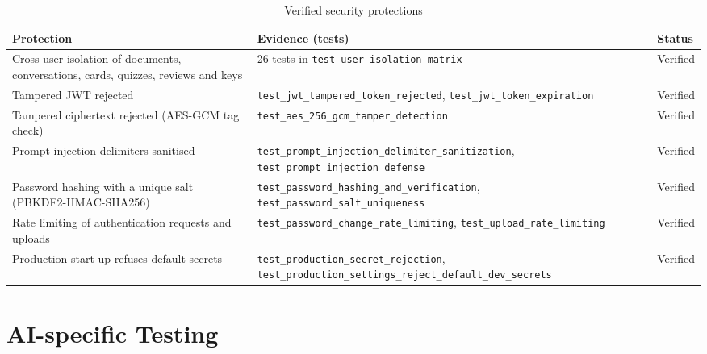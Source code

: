 \begin{table}[!htbp]
\centering
\caption{Verified security protections}\label{tab:vapt}
\small
\begin{tabularx}{\textwidth}{@{}>{\raggedright\arraybackslash}p{} X l@{}}
\toprule
\textbf{Protection} & \textbf{Evidence (tests)} & \textbf{Status}\\
\midrule
Cross-user isolation of documents, conversations, cards, quizzes, reviews and keys & 26 tests in \texttt{test\_user\_isolation\_matrix} & Verified\\
Tampered JWT rejected & \texttt{test\_jwt\_tampered\_token\_rejected}, \texttt{test\_jwt\_token\_expiration} & Verified\\
Tampered ciphertext rejected (AES-GCM tag check) & \texttt{test\_aes\_256\_gcm\_tamper\_detection} & Verified\\
Prompt-injection delimiters sanitised & \texttt{test\_prompt\_injection\_delimiter\_sanitization}, \texttt{test\_prompt\_injection\_defense} & Verified\\
Password hashing with a unique salt (PBKDF2-HMAC-SHA256) & \texttt{test\_password\_hashing\_and\_verification}, \texttt{test\_password\_salt\_uniqueness} & Verified\\
Rate limiting of authentication requests and uploads & \texttt{test\_password\_change\_rate\_limiting}, \texttt{test\_upload\_rate\_limiting} & Verified\\
Production start-up refuses default secrets & \texttt{test\_production\_secret\_rejection}, \texttt{test\_production\_settings\_reject\_default\_dev\_secrets} & Verified\\
\bottomrule
\end{tabularx}
\end{table}

\section{AI-specific Testing}

